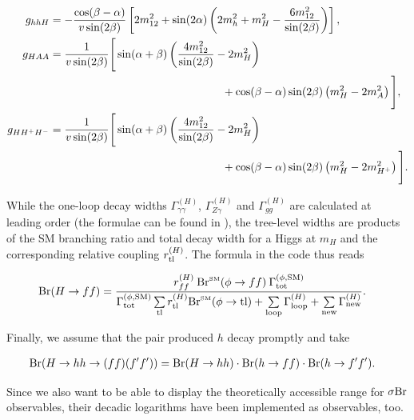 \documentclass[preprint,3p,12pt]{elsarticle}
\begin{document}
{\begin{align}
 g_{hhH} &= -\frac{\cos(\beta-\alpha)}{v \sin (2\beta)} \left[ 2 m_{12}^2 +\sin (2\alpha) \left( 2 m_h^2 + m_H^2 - \frac{6 m_{12}^2}{\sin (2\beta)} \right) \right] ,\nonumber \\
 g_{HAA} &= \frac{1}{v \sin (2\beta)} \Bigg[ \sin(\alpha+\beta) \left( \frac{4 m_{12}^2}{\sin (2\beta)} -2 m_H^2 \right) \phantom{\Bigg]}\nonumber \\
 & \hspace*{150pt} \phantom{\Bigg[} + \cos(\beta-\alpha) \sin (2\beta) \left( m_H^2 -2 m_A^2 \right) \Bigg] ,\nonumber \\
 g_{HH^+H^-} &= \frac{1}{v \sin (2\beta)} \Bigg[ \sin(\alpha+\beta) \left( \frac{4 m_{12}^2}{\sin (2\beta)} -2 m_H^2 \right) \phantom{\Bigg]}\nonumber \\
 & \hspace*{150pt} \phantom{\Bigg[} +\cos(\beta-\alpha) \sin (2\beta) \left( m_H^2 -2 m_{H^+}^2 \right) \Bigg] .\nonumber
\end{align}


While the one-loop decay widths $\Gamma_{\gamma \gamma}^{(H)}$, $\Gamma_{Z \gamma}^{(H)}$ and $\Gamma_{gg}^{(H)}$ are calculated at leading order (the formulae can be found in \cite{Gunion:1989we}), the tree-level widths are products of the SM branching ratio and total decay width for a Higgs at $m_H$ and the corresponding relative coupling $r_{\rm tl}^{(H)}$.
The formula in the code thus reads

\begin{align}
 {\rm Br}(H\to ff) &= \frac{r_{ff}^{(H)} \: {\rm Br}^{\text{\tiny{SM}}} (\phi \to ff) \: \Gamma^{(\phi ,\text{SM})}_{\text{tot}}}{\Gamma^{(\phi ,\text{SM})}_{\text{tot}} \sum\limits_{\rm tl} r_{\rm tl}^{(H)} {\rm Br}^{\text{\tiny{SM}}} (\phi \to {\rm tl}) + \sum\limits_{\rm loop} \Gamma_{\rm loop}^{(H)} + \sum\limits_{\rm new} \Gamma_{\rm new}^{(H)}} \nonumber .
\end{align}

Finally, we assume that the pair produced $h$ decay promptly and take

\begin{align}
 {\rm Br}(H\to hh\to (ff)(f'f')) &=  {\rm Br}(H\to hh)  \cdot {\rm Br}(h\to ff)  \cdot {\rm Br}(h\to f'f')\nonumber .
\end{align}

Since we also want to be able to display the theoretically accessible range for $\sigma {\rm Br}$ observables, their decadic logarithms have been implemented as observables, too.

}
\end{document}
